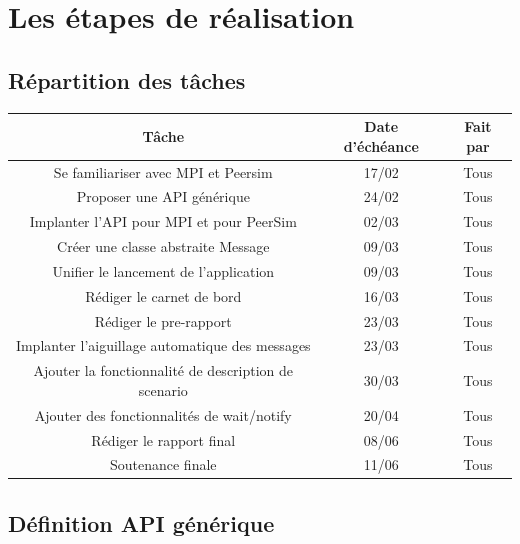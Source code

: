 \documentclass{article}
\begin{document}
		\section{Les étapes de réalisation}
			
			\subsection{Répartition des tâches}
			\begin{tabular}{|c|c|c|}
				\hline
				Tâche & Date d'échéance & Fait par\\[1mm]
				\hline
		  		Se familiariser avec MPI et Peersim & 17/02 & Tous\\[1mm]
				\hline
				Proposer une API générique & 24/02 & Tous\\[1mm]
				\hline
				Implanter l'API pour MPI et pour PeerSim & 02/03 & Tous \\[1mm]
				\hline
				Créer une classe abstraite Message & 09/03 & Tous\\[1mm]
				\hline
				Unifier le lancement de l'application & 09/03 & Tous\\[1mm]
				\hline
				Rédiger le carnet de bord & 16/03 & Tous\\[1mm]
				\hline
				Rédiger le pre-rapport & 23/03 & Tous\\[1mm]
				\hline 
				Implanter l'aiguillage automatique des messages & 23/03 & Tous\\[1mm]
				\hline
				Ajouter la fonctionnalité de description de scenario & 30/03 & Tous\\[1mm]
				\hline
				Ajouter des fonctionnalités de wait/notify & 20/04 & Tous\\[1mm]
				\hline 
				Rédiger le rapport final & 08/06 & Tous\\[1mm]
				\hline
				Soutenance finale & 11/06 & Tous\\[1mm]
				\hline
			\end{tabular}			
			\newpage			
			\subsection{Définition API générique}
			
\end{document}
